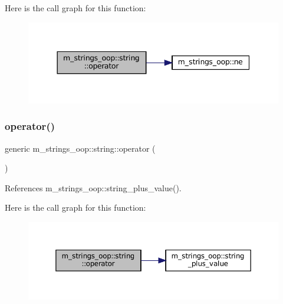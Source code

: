 Here is the call graph for this function\+:\nopagebreak
\begin{figure}[H]
\begin{center}
\leavevmode
\includegraphics[width=344pt]{structm__strings__oop_1_1string_a1e081318a04d087b5482edb5ef33ad20_cgraph}
\end{center}
\end{figure}
\mbox{\label{structm__strings__oop_1_1string_a4fc177a34f239d217be25f6e52e60583}} 
\subsubsection{\texorpdfstring{operator()}{operator()}\hspace{0.1cm}{\footnotesize\ttfamily [7/10]}}
{\footnotesize\ttfamily generic m\+\_\+strings\+\_\+oop\+::string\+::operator (\begin{DoxyParamCaption}{ }\end{DoxyParamCaption})\hspace{0.3cm}{\ttfamily [private]}}



References m\+\_\+strings\+\_\+oop\+::string\+\_\+plus\+\_\+value().

Here is the call graph for this function\+:\nopagebreak
\begin{figure}[H]
\begin{center}
\leavevmode
\includegraphics[width=350pt]{structm__strings__oop_1_1string_a4fc177a34f239d217be25f6e52e60583_cgraph}
\end{center}
\end{figure}
\mbox{\label{structm__strings__oop_1_1string_a4e78105db2bb68c2783dae2e9242030d}} 
